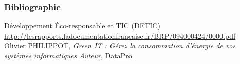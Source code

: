 \documentclass[slidetop,11pt]{beamer}
\begin{document}
\begin{frame} 
\frametitle{Bibliographie}
\begin{thebibliography}{GreenIT}

 Développement \'Eco-responsable et TIC (DETIC)
\url{http://lesrapports.ladocumentationfrancaise.fr/BRP/094000424/0000.pdf}\\

 Olivier PHILIPPOT, \emph{Green IT : Gérez la consommation d'énergie de vos systèmes informatiques Auteur}, DataPro\\

\end{thebibliography}
\end{frame}
\end{document}
